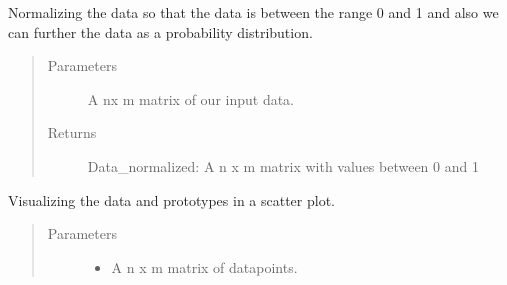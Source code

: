 \documentclass[letterpaper,10pt,english]{sphinxmanual}
\begin{document}
\begin{fulllineitems}
\begin{fulllineitems}
\label{\detokenize{Renyi_final:Renyi_final.GLVQ.new_proto_types}}
\end{fulllineitems}


\begin{fulllineitems}
\label{\detokenize{Renyi_final:Renyi_final.GLVQ.normalize_data}}
\sphinxAtStartPar
Normalizing the data so that the data is between the range 0 and 1 and also we can further the data as
a probability distribution.
\begin{quote}\begin{description}
\item[{Parameters}] \leavevmode
\sphinxAtStartPar
{} \textendash{} A nx m matrix of our input data.

\item[{Returns}] \leavevmode
\sphinxAtStartPar
Data\_normalized: A n x m matrix with values between 0 and 1

\end{description}\end{quote}

\end{fulllineitems}


\begin{fulllineitems}
\label{\detokenize{Renyi_final:Renyi_final.GLVQ.plot}}
\sphinxAtStartPar
Visualizing the data and prototypes in a scatter plot.
\begin{quote}\begin{description}
\item[{Parameters}] \leavevmode\begin{itemize}
\item {} 
\sphinxAtStartPar
{} \textendash{} A n x m matrix of datapoints.


\end{itemize}
\end{description}
\end{quote}
\end{fulllineitems}
\end{fulllineitems}
\end{document}
